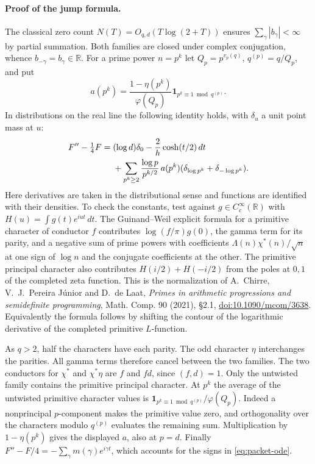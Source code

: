 \paragraph{Proof of the jump formula.}
The classical zero count $N(T)=O_{q,d}(T\log(2+T))$ ensures
$\sum_\gamma |b_\gamma|<\infty$ by partial summation. Both families are closed
under complex conjugation, whence $b_{-\gamma}=b_\gamma\in\mathbb R$.
For a prime power $n=p^k$ let $Q_p=p^{v_p(q)}$, $q^{(p)}=q/Q_p$, and put
\[
 a(p^k)=\frac{1-\eta(p^k)}{\varphi(Q_p)}
               \mathbf 1_{p^k\equiv1\bmod q^{(p)}} .
\]
In distributions on the real line the following identity holds, with
$\delta_u$ a unit point mass at $u$:
\begin{align}
 F''-\tfrac14 F={}&(\log d)\delta_0-
       \frac2h\cosh(t/2)\,dt \notag\\
 &+\sum_{p^k\ge2}\frac{\log p}{p^{k/2}}\,a(p^k)
                     (\delta_{\log p^k}+\delta_{-\log p^k}).
 \label{eq:packet-ode}
\end{align}
Here derivatives are taken in the distributional sense and functions are
identified with their densities. To check the constants, test against
$g\in C_c^\infty(\mathbb R)$ with
$H(u)=\int g(t)e^{iut}\,dt$. The Guinand--Weil explicit formula for a
primitive character of conductor $f$ contributes $\log(f/\pi)g(0)$, the
gamma term for its parity, and a negative sum of prime powers with
coefficients $\Lambda(n)\chi^*(n)/\sqrt n$ at one sign of $\log n$ and
the conjugate coefficients at the other. The primitive principal character
also contributes $H(i/2)+H(-i/2)$ from the poles at $0,1$ of the completed
zeta function. This is the normalization of
A.~Chirre, V.~J.~Pereira J\'unior and D.~de Laat,
\emph{Primes in arithmetic progressions and semidefinite programming},
Math. Comp. 90 (2021), \S2.1,
\href{https://doi.org/10.1090/mcom/3638}{doi:10.1090/mcom/3638}.
Equivalently the formula follows by shifting the contour of the logarithmic
derivative of the completed primitive $L$-function.

As $q>2$, half the characters have each parity. The odd character $\eta$
interchanges the parities. All gamma terms therefore cancel between the two
families. The two conductors for $\chi^*$ and $\chi^*\eta$ are $f$ and
$fd$, since $(f,d)=1$. Only the untwisted family contains the primitive
principal character. At $p^k$ the average of the untwisted primitive
character values is $\mathbf 1_{p^k\equiv1\bmod q^{(p)}}/\varphi(Q_p)$.
Indeed a nonprincipal $p$-component makes the primitive value zero,
and orthogonality over the characters modulo $q^{(p)}$ evaluates the
remaining sum. Multiplication by $1-\eta(p^k)$ gives the displayed $a$,
also at $p=d$. Finally $F''-F/4=-\sum_\gamma m(\gamma)e^{i\gamma t}$,
which accounts for the signs in \eqref{eq:packet-ode}.

